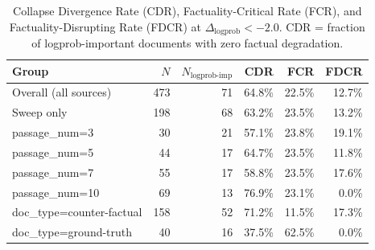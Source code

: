\begin{table}[h]
\centering
\small
\begin{tabular}{lrrrrr}
\toprule
Group & $N$ & $N_{\text{logprob-imp}}$ & CDR & FCR & FDCR \\
\midrule
  Overall (all sources) & 473 & 71 & 64.8\% & 22.5\% & 12.7\% \\
  Sweep only & 198 & 68 & 63.2\% & 23.5\% & 13.2\% \\
  passage_num=3 & 30 & 21 & 57.1\% & 23.8\% & 19.1\% \\
  passage_num=5 & 44 & 17 & 64.7\% & 23.5\% & 11.8\% \\
  passage_num=7 & 55 & 17 & 58.8\% & 23.5\% & 17.6\% \\
  passage_num=10 & 69 & 13 & 76.9\% & 23.1\% & 0.0\% \\
  doc_type=counter-factual & 158 & 52 & 71.2\% & 11.5\% & 17.3\% \\
  doc_type=ground-truth & 40 & 16 & 37.5\% & 62.5\% & 0.0\% \\
\bottomrule
\end{tabular}
\caption{Collapse Divergence Rate (CDR), Factuality-Critical Rate (FCR), and
Factuality-Disrupting Rate (FDCR) at $\Delta_{\text{logprob}} < -2.0$.
CDR = fraction of logprob-important documents with zero factual degradation.}
\label{tab:e1_cdr}
\end{table}
